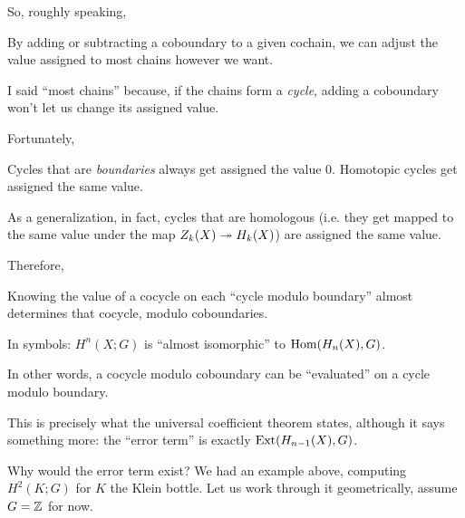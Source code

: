So, roughly speaking,
\begin{moral}
	By adding or subtracting a coboundary to a given cochain, we can adjust the value assigned to
	most chains however we want.
\end{moral}
I said ``most chains'' because, if the chains form a \emph{cycle}, adding a coboundary won't let us
change its assigned value.

Fortunately,
\begin{itemize}
	\ii Cycles that are \emph{boundaries} always get assigned the value $0$.
	\ii Homotopic cycles get assigned the same value.

	As a generalization, in fact, cycles that are homologous (i.e. they get mapped to
	the same value under the map $Z_k(X) \twoheadrightarrow H_k(X)$) are assigned the same value.
\end{itemize}

Therefore,
\begin{moral}
	Knowing the value of a cocycle on each ``cycle modulo boundary'' almost determines that cocycle,
	modulo coboundaries.
\end{moral}
In symbols: $H^n(X; G)$ is ``almost isomorphic'' to $\operatorname{Hom}(H_n(X), G)$.

In other words, a cocycle modulo coboundary can be ``evaluated'' on a cycle modulo boundary.

This is precisely what the universal coefficient theorem states, although it says something more:
the ``error term'' is exactly $\operatorname{Ext}(H_{n-1}(X), G)$.

Why would the error term exist? We had an example above, computing $H^2(K; G)$ for $K$ the Klein
bottle. Let us work through it geometrically, assume $G = \mathbb Z$ for now.


